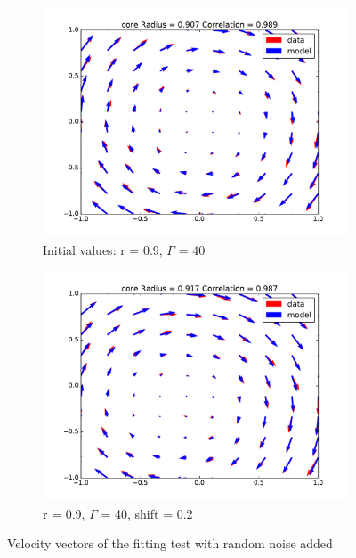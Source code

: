 \documentclass[12pt, a4paper, openany]{memoir}
\begin{document}
\begin{figure}[h!]
\begin{subfigure}[b]{0.45\textwidth}
		\includegraphics[trim=40 20 40 20 ,clip, width=\textwidth]{figure/test_09_40N.pdf}
		\caption{Initial values: r = 0.9, $\Gamma$ = 40}
	\end{subfigure}
	\begin{subfigure}[b]{0.45\textwidth}
		\centering
		\includegraphics[trim=40 20 40 20 ,clip, width=\textwidth]{figure/test_09_40_02N.pdf}
		\caption{r = 0.9, $\Gamma$ = 40, shift = 0.2}
	\end{subfigure}
	\caption{Velocity vectors of the fitting test with random noise added}
	\label{fig:fittingtestsnoise}
\end{figure}
\end{document}
